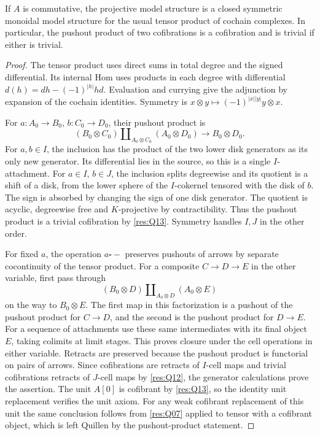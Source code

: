 \begin{theorem}\label{res:Q15}
If \(A\) is commutative, the projective model structure
is a closed symmetric monoidal model structure for the
usual tensor product of cochain complexes. In particular,
the pushout product of two cofibrations is a cofibration
and is trivial if either is trivial.
\end{theorem}
\begin{proof}
The tensor product uses direct sums in total degree and
the signed differential. Its internal Hom uses products
in each degree with differential
\(d(h)=d h-(-1)^{|h|}h d\). Evaluation and currying give
the adjunction by expansion of the cochain identities.
Symmetry is \(x\otimes y\mapsto(-1)^{|x||y|}y\otimes x\).

For \(a:A_0\to B_0\), \(b:C_0\to D_0\), their
pushout product is
\[
 (B_0\otimes C_0)\amalg_{A_0\otimes C_0}(A_0\otimes D_0)
 \longrightarrow B_0\otimes D_0.
\]
For \(a,b\in I\), the inclusion has the product of the
two lower disk generators as its only new generator.
Its differential lies in the source, so this is a
single \(I\)-attachment. For \(a\in I\), \(b\in J\),
the inclusion splits degreewise and its quotient is
a shift of a disk, from the lower sphere of the
\(I\)-cokernel tensored with the disk of \(b\).
The sign is absorbed by changing the sign of one disk
generator. The quotient is acyclic, degreewise free
and \(K\)-projective by contractibility. Thus the
pushout product is a trivial cofibration by
\ref{res:Q13}. Symmetry handles \(I,J\) in the other order.

For fixed \(a\), the operation \(a\square -\)
preserves pushouts of arrows by separate cocontinuity
of the tensor product. For a composite \(C\to D\to E\)
in the other variable, first pass through
\[
 (B_0\otimes D)\amalg_{A_0\otimes D}(A_0\otimes E)
\]
on the way to \(B_0\otimes E\). The first map in
this factorization is a pushout of the pushout product
for \(C\to D\), and the second is the pushout product
for \(D\to E\). For a sequence of attachments use these
same intermediates with its final object \(E\), taking
colimits at limit stages. This proves closure under
the cell operations in either variable. Retracts are
preserved because the pushout product is functorial
on pairs of arrows. Since cofibrations are retracts
of \(I\)-cell maps and trivial cofibrations retracts
of \(J\)-cell maps by \ref{res:Q12}, the generator
calculations prove the assertion. The unit \(A[0]\)
is cofibrant by \ref{res:Q13}, so the identity unit
replacement verifies the unit axiom. For any weak
cofibrant replacement of this unit the same conclusion
follows from \ref{res:Q07} applied to tensor with a
cofibrant object, which is left Quillen by the
pushout-product statement.
\end{proof}

